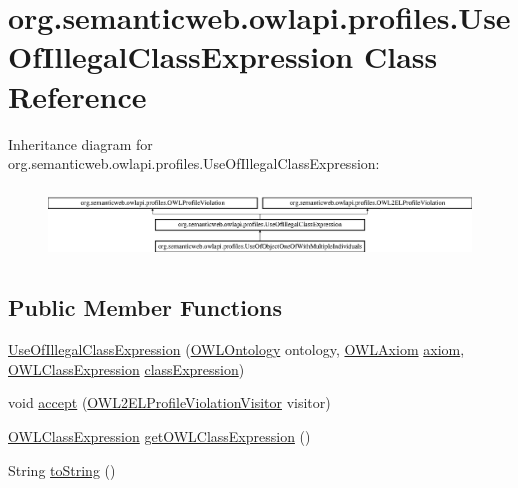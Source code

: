 \hypertarget{classorg_1_1semanticweb_1_1owlapi_1_1profiles_1_1_use_of_illegal_class_expression}{\section{org.\-semanticweb.\-owlapi.\-profiles.\-Use\-Of\-Illegal\-Class\-Expression Class Reference}
\label{classorg_1_1semanticweb_1_1owlapi_1_1profiles_1_1_use_of_illegal_class_expression}
}
Inheritance diagram for org.\-semanticweb.\-owlapi.\-profiles.\-Use\-Of\-Illegal\-Class\-Expression\-:\begin{figure}[H]
\begin{center}
\leavevmode
\includegraphics[height=1.896163cm]{classorg_1_1semanticweb_1_1owlapi_1_1profiles_1_1_use_of_illegal_class_expression}
\end{center}
\end{figure}
\subsection*{Public Member Functions}
\begin{DoxyCompactItemize}
\item 
\hyperlink{classorg_1_1semanticweb_1_1owlapi_1_1profiles_1_1_use_of_illegal_class_expression_a36596b408c5993be68fd56a4dd305a13}{Use\-Of\-Illegal\-Class\-Expression} (\hyperlink{interfaceorg_1_1semanticweb_1_1owlapi_1_1model_1_1_o_w_l_ontology}{O\-W\-L\-Ontology} ontology, \hyperlink{interfaceorg_1_1semanticweb_1_1owlapi_1_1model_1_1_o_w_l_axiom}{O\-W\-L\-Axiom} \hyperlink{classorg_1_1semanticweb_1_1owlapi_1_1profiles_1_1_o_w_l_profile_violation_aa7c8e8910ed3966f64a2c003fb516214}{axiom}, \hyperlink{interfaceorg_1_1semanticweb_1_1owlapi_1_1model_1_1_o_w_l_class_expression}{O\-W\-L\-Class\-Expression} \hyperlink{classorg_1_1semanticweb_1_1owlapi_1_1profiles_1_1_use_of_illegal_class_expression_aa4561e3c7abbb0f438f5e3adad5977f0}{class\-Expression})
\item 
void \hyperlink{classorg_1_1semanticweb_1_1owlapi_1_1profiles_1_1_use_of_illegal_class_expression_a89b0b7eb0b60b3c459be385d61a5b111}{accept} (\hyperlink{interfaceorg_1_1semanticweb_1_1owlapi_1_1profiles_1_1_o_w_l2_e_l_profile_violation_visitor}{O\-W\-L2\-E\-L\-Profile\-Violation\-Visitor} visitor)
\item 
\hyperlink{interfaceorg_1_1semanticweb_1_1owlapi_1_1model_1_1_o_w_l_class_expression}{O\-W\-L\-Class\-Expression} \hyperlink{classorg_1_1semanticweb_1_1owlapi_1_1profiles_1_1_use_of_illegal_class_expression_a2e29a2dfc23e83ae5c4b336453e84ca0}{get\-O\-W\-L\-Class\-Expression} ()
\item 
String \hyperlink{classorg_1_1semanticweb_1_1owlapi_1_1profiles_1_1_use_of_illegal_class_expression_aa43e0cc2565646dc155c0a3d1c3d3425}{to\-String} ()
\end{DoxyCompactItemize}
